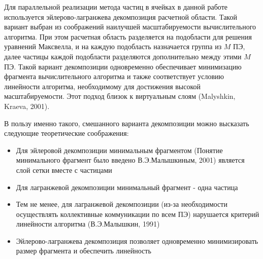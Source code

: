 Для параллельной реализации метода частиц в ячейках в данной работе используется эйлерово-лагранжева декомпозиция расчетной области. Такой вариант выбран из соображений наилучшей масштабируемости вычислительного алгоритма.
При этом расчетная область разделяется на подобласти для решения уравнений Максвелла, и на каждую подобласть назначается группа из $M$ ПЭ, далее частицы каждой подобласти разделяются дополнительно между этими $M$ ПЭ. Такой вариант декомпозиции одновременно обеспечивает минимизацию фрагмента вычислительного алгоритма и также соответствует условию линейности алгоритма, необходимому для достижения высокой масштабируемости. Этот подход близок к виртуальным слоям (Malyshkin, Kraeva, 2001).

В пользу именно такого, смешанного варианта декомпозиции можно высказать следующие теоретические соображения:
\begin{itemize}
	\item Для эйлеровой декомпозиции минимальным фрагментом (Понятие минимального фрагмент было введено В.Э.Малышкиным, 2001) является слой сетки вместе с частицами
	\item Для лагранжевой декомпозиции минимальный фрагмент - одна частица
	\item Тем не менее, для лагранжевой декомпозиции (из-за необходимости осуществлять коллективные коммуникации по всем ПЭ) нарушается критерий линейности алгоритма (В.Э.Малышкин, 1991)
	\item Эйлерово-лагранжева декомпозиция позволяет одновременно минимизировать размер фрагмента и обеспечить линейность
	
\end{itemize}




